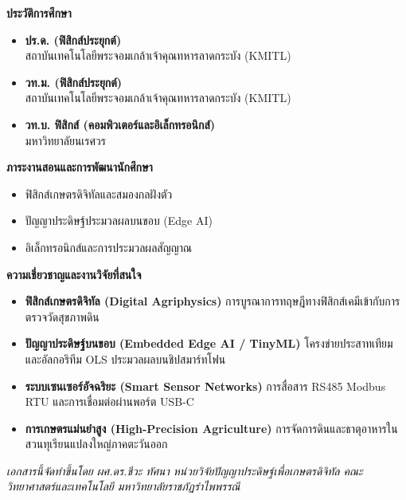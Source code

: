 \begin{minipage}[t]{0.48\textwidth}
    {\fontsize{12}{15}\selectfont\bfseries\color{rbruNavy} ประวัติการศึกษา\par}
    \vspace{2mm}
    \begin{itemize}[leftmargin=1.2em, itemsep=4pt]
        \item \textbf{ปร.ด. (ฟิสิกส์ประยุกต์)}\\สถาบันเทคโนโลยีพระจอมเกล้าเจ้าคุณทหารลาดกระบัง (KMITL)
        \item \textbf{วท.ม. (ฟิสิกส์ประยุกต์)}\\สถาบันเทคโนโลยีพระจอมเกล้าเจ้าคุณทหารลาดกระบัง (KMITL)
        \item \textbf{วท.บ. ฟิสิกส์ (คอมพิวเตอร์และอิเล็กทรอนิกส์)}\\มหาวิทยาลัยนเรศวร
    \end{itemize}

    \vspace{4mm}
    {\fontsize{12}{15}\selectfont\bfseries\color{rbruNavy} ภาระงานสอนและการพัฒนานักศึกษา\par}
    \vspace{2mm}
    \begin{itemize}[leftmargin=1.2em, itemsep=3pt]
        \item ฟิสิกส์เกษตรดิจิทัลและสมองกลฝังตัว
        \item ปัญญาประดิษฐ์ประมวลผลบนขอบ (Edge AI)
        \item อิเล็กทรอนิกส์และการประมวลผลสัญญาณ
    \end{itemize}
\end{minipage}
\hfill
\begin{minipage}[t]{0.48\textwidth}
    {\fontsize{12}{15}\selectfont\bfseries\color{rbruNavy} ความเชี่ยวชาญและงานวิจัยที่สนใจ\par}
    \vspace{2mm}
    \begin{itemize}[leftmargin=1.2em, itemsep=4pt]
        \item \textbf{ฟิสิกส์เกษตรดิจิทัล (Digital Agriphysics)} การบูรณาการทฤษฎีทางฟิสิกส์เคมีเข้ากับการตรวจวัดสุขภาพดิน
        \item \textbf{ปัญญาประดิษฐ์บนขอบ (Embedded Edge AI / TinyML)} โครงข่ายประสาทเทียมและอัลกอริทึม OLS ประมวลผลบนชิปสมาร์ทโฟน
        \item \textbf{ระบบเซนเซอร์อัจฉริยะ (Smart Sensor Networks)} การสื่อสาร RS485 Modbus RTU และการเชื่อมต่อผ่านพอร์ต USB-C
        \item \textbf{การเกษตรแม่นยำสูง (High-Precision Agriculture)} การจัดการดินและธาตุอาหารในสวนทุเรียนแปลงใหญ่ภาคตะวันออก
    \end{itemize}
\end{minipage}

\vspace{1.0cm}
\begin{center}
    {\fontsize{9}{12}\selectfont\itshape\color{rbruSlate} เอกสารนี้จัดทำขึ้นโดย ผศ.ดร.ชีวะ ทัศนา หน่วยวิจัยปัญญาประดิษฐ์เพื่อเกษตรดิจิทัล คณะวิทยาศาสตร์และเทคโนโลยี มหาวิทยาลัยราชภัฏรำไพพรรณี\par}
\end{center}

\clearpage
